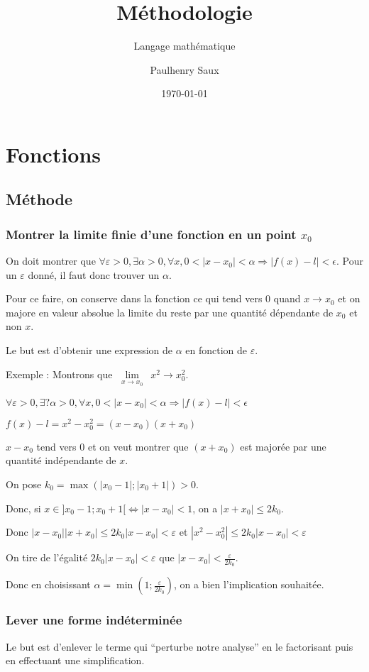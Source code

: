 \documentclass[french]{yLectureNote}
\title{Méthodologie}
\subtitle{Langage mathématique}
\author{Paulhenry Saux}
\date{\today}
\newcommand{\Lim}[1]{\lim\limits_{\substack{#1}}\:}
\begin{document}
\setcounter{chapter}{2}

	\chapter{Fonctions}
\section{Méthode}
\subsection{Montrer la limite finie d'une fonction en un point $x_0$}
On doit montrer que $\forall \varepsilon >0, \exists \alpha >0, \forall x, 0< |x-x_0|<\alpha \Rightarrow |f(x) - l|<\epsilon$. Pour un $\varepsilon$ donné, il faut donc trouver un $\alpha$.

Pour ce faire, on conserve dans la fonction ce qui tend vers 0 quand $x\rightarrow x_0$ et on majore en valeur absolue la limite du reste par une quantité dépendante de $x_0$ et non $x$.

Le but est d'obtenir une expression de $\alpha$ en fonction de $\varepsilon$.

Exemple : Montrons que $\Lim{x\rightarrow x_0} x^2 \rightarrow x_0^2$.

$\forall \varepsilon >0, \exists ? \alpha >0, \forall x, 0< |x-x_0|<\alpha \Rightarrow |f(x) - l|<\epsilon$

$f(x)-l = x^2-x_0^2 = (x-x_0)(x+x_0)$

$x-x_0$ tend vers 0 et on veut montrer que $(x+x_0)$ est majorée par une quantité indépendante de $x$.

On pose $k_0 = \max(|x_0-1|;|x_0+1|) > 0$.

Donc, si $x\in ]x_0-1;x_0+1[ \iff |x-x_0|<1$, on a $ |x+x_0| \leq 2k_0$.

Donc $|x-x_0||x+x_0| \leq 2k_0|x-x_0| <\varepsilon$ et $|x^2-x_0^2| \leq 2k_0|x-x_0| <\varepsilon$

On tire de l'égalité $2k_0|x-x_0| <\varepsilon$ que $|x-x_0| <\frac{\varepsilon}{2k_0}$.

Donc en choisissant $\alpha = \min(1; \frac{\varepsilon}{2k_0})$, on a bien l'implication souhaitée.
\subsection{Lever une forme indéterminée}
Le but est d'enlever le terme qui ``perturbe notre analyse'' en le factorisant puis en effectuant une simplification.
\end{document}
